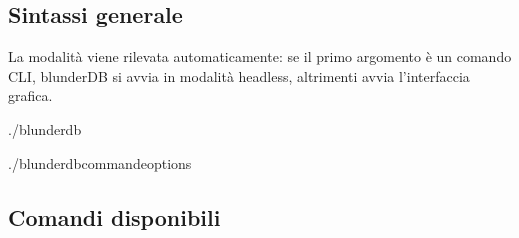 \documentclass[letterpaper,10pt,italian]{sphinxmanual}
\begin{document}
\subsection{Sintassi generale}
\label{\detokenize{cli:syntaxe-generale}}
\sphinxAtStartPar
La modalità viene rilevata automaticamente: se il primo argomento è un comando CLI, blunderDB si avvia in modalità headless, altrimenti avvia l’interfaccia grafica.

\begin{sphinxVerbatim}[commandchars=\\\{\}]
./blunderdb

./blunderdb\PYGZlt{}commande\PYGZgt{}\PYG{o}{[}options\PYG{o}{]}
\end{sphinxVerbatim}


\subsection{Comandi disponibili}
\label{\detokenize{cli:commandes-disponibles}}
\end{document}
